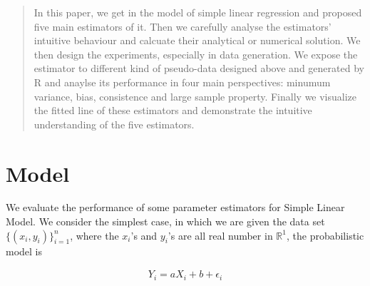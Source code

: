 \documentclass[twoside]{article}
\begin{document}
%

%


\begin{abstract}

In this paper, we get in the model of simple linear regression and proposed five main estimators of it. Then we carefully analyse the estimators' intuitive behaviour and calcuate their analytical or numerical solution. We then design the experiments, especially in data generation. We expose the estimator to different kind of pseudo-data designed above and generated by R and anaylse its performance in four main perspectives: minumum variance, bias, consistence and large sample property. Finally we visualize the fitted line of these estimators and demonstrate the intuitive understanding of the five estimators.

\end{abstract}

\section{Model}

We evaluate the performance of some parameter estimators for Simple Linear Model. We consider the simplest case, in which we are given the data set $\{(x_i,y_i)\}_{i=1}^n$, where the $x_i$'s and $y_i$'s are all real number in $\mathbb{R}^1$, the probabilistic model is

\begin{eqnarray}
  Y_i = a X_i + b + \epsilon_i
\end{eqnarray}
\end{document}
